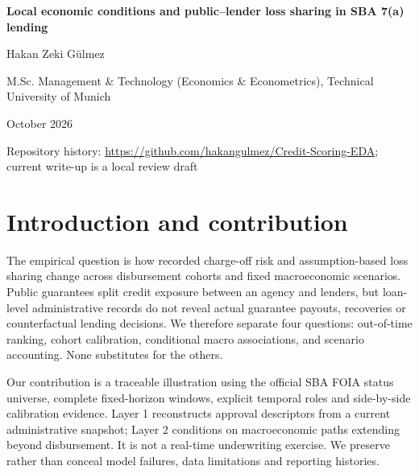 

\begin{center}
{\LARGE\bfseries Local economic conditions and public--lender loss sharing in SBA 7(a) lending}\par\vspace{6pt}
Hakan Zeki Gülmez\par
M.Sc. Management \& Technology (Economics \& Econometrics), Technical University of Munich\par
October 2026\par\small Repository history: \url{https://github.com/hakangulmez/Credit-Scoring-EDA}; current write-up is a local review draft
\end{center}
\begin{abstract}
We examine out-of-time charge-off discrimination, calibration and conditional loss-sharing scenarios in approved and disbursed SBA lending. Term-free Firth logistic models separate reconstructed approval descriptors from future state macroeconomic paths. Crisis AUC is \AucCrisis, but predicted and recorded rates differ materially (\PdCrisis\% versus \RateCrisis\%). A conditional endpoint unemployment increase is associated with \Endpoint\ probability percentage points on the fixed reference portfolio. Baseline and adverse gross expected-loss proxies are \ElBase\ and \ElAdverse\ million dollars, with assumption-based public/lender allocation. Administrative measurement, unverified feature vintages, calibration failure, revised data and a post-results protocol amendment limit inference; these are neither causal effects nor measured fiscal costs.
\end{abstract}
\section{Introduction and contribution}
The empirical question is how recorded charge-off risk and assumption-based loss sharing change across disbursement cohorts and fixed macroeconomic scenarios. Public guarantees split credit exposure between an agency and lenders, but loan-level administrative records do not reveal actual guarantee payouts, recoveries or counterfactual lending decisions. We therefore separate four questions: out-of-time ranking, cohort calibration, conditional macro associations, and scenario accounting. None substitutes for the others.

Our contribution is a traceable illustration using the official SBA FOIA status universe, complete fixed-horizon windows, explicit temporal roles and side-by-side calibration evidence. Layer 1 reconstructs approval descriptors from a current administrative snapshot; Layer 2 conditions on macroeconomic paths extending beyond disbursement. It is not a real-time underwriting exercise. We preserve rather than conceal model failures, data limitations and reporting histories.

